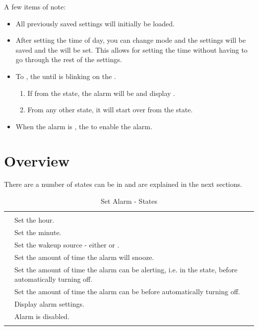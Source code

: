 \pagebreak

A few items of note:

\begin{itemize}
  \item All previously saved settings will initially be loaded.
  \item After setting the time of day, you can change mode and the settings
    will be saved and the  will be set.  This allows for setting the time
    without having to go through the rest of the settings.
  \item To ,  the  until \symD{<<<<} is blinking on
    the .
    \begin{enumerate}
      \item If  from the  state, the alarm will be
         and display .
      \item From any other state, it will start over from the  state.
    \end{enumerate}
  \item When the alarm is ,  the  to enable the alarm.
\end{itemize}

\section{Overview}

There are a number of states  can be in and are explained in the next
sections.

\begin{table}[H]
\centering
\begin{tabu}{ X[1,c,m] | X[3,l,m] }
  \thrule

   &  \\ \mrule

   & Set the hour. \\ 
   & Set the minute. \\ 
   & Set the wakeup source - either  or . \\ 
   & Set the amount of time the alarm will snooze. \\ 
   & Set the amount of time the alarm can be alerting, i.e. in the
     state, before automatically turning off. \\ 
   & Set the amount of time the alarm can be  
                before automatically turning off. \\ 
   & Display alarm settings. \\ 
   & Alarm is disabled. \\
  \bhrule
\end{tabu}
\caption{Set Alarm - States}
\end{table}

